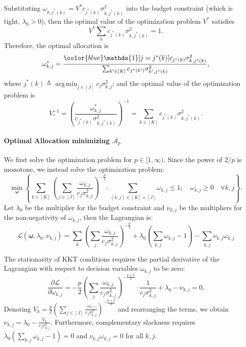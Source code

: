 \documentclass{article}
\def\gA{{\mathcal{A}}}
\def\gL{{\mathcal{L}}}
\DeclareMathOperator*{\argmin}{arg\,min}
\theoremstyle{plain}
\theoremstyle{definition}
\theoremstyle{plain}
\newcommand{\indicator}{\mathds{1}}
\begin{document}
Substituting $\omega_{k, j^*(k)} = V^* c_{j^*(k)} \sigma_{k, j^*(k)}^2$ into the budget constraint (which is tight, $\lambda_0 > 0$), then the optimal value of the optimization problem $V^*$ satisfies
\begin{equation}
    V^* \sum_{k}  c_{j^*(k)} \sigma_{k, j^*(k)}^2 = 1 .
\end{equation}
Therefore, the optimal allocation is
\begin{equation}
    \omega_{k,j}^* = \frac{{\color{blue}\indicator[j = j^*(k)]} c_{j^*(k)} \sigma_{k,j^*(k)}^2 }{\sum_{k' \in [K]} c_{j^*(k')} \sigma_{k',j^*(k)}^2 },
\end{equation}
where $j^*(k) \triangleq \argmin_{j \in [J]} c_j \sigma_{k,j}^2$; and the optimal value of the optimization problem is 
\begin{equation}
    V_*^{-1} = \left( \frac{\omega_{k,j}^*}{c_{j^*(k)} \sigma_{k,j^*(k)}^2} \right)^{-1} = \sum_{k\in[K]} c_{j^*(k)} \sigma_{k,j^*(k)}^2.
\end{equation}

\paragraph{Optimal Allocation minimizing $\gA_p$}
We first solve the optimization problem for $p\in[1,\infty)$.
Since the power of $2/p$ is monotone, we instead solve the optimization problem:
\begin{equation}
    \min_{\bm\omega} \left\{ \sum_{k \in [K]} \left( \sum_{j\in[J]} \frac{\omega_{k,j}}{c_j \sigma_{k,j}^2} \right)^{-\frac{p}{2}} : \sum_{(k,j) \in [K] \times [J]} \omega_{k,j} \leq 1; \quad \omega_{k,j} \geq 0 \quad \forall k,j \right\}.
\end{equation}
Let $\lambda_0$ be the multiplier for the budget constraint and $\nu_{k,j}$ be the multipliers for the non-negativity of $\omega_{k,j}$, then the Lagrangian is:
\begin{equation}
    \gL(\bm\omega, \lambda_0, \nu_{k,j}) =  \sum_{k} \left( \sum_{j} \frac{\omega_{k,j}}{c_j \sigma_{k,j}^2} \right)^{-\frac{p}{2}} + \lambda_0 \left( \sum_{k,j} \omega_{k,j} - 1 \right) - \sum_{k,j} \nu_{k,j} \omega_{k,j}
\end{equation}

The stationarity of KKT conditions requires the partial derivative of the Lagrangian with respect to decision variables $\omega_{k,j}$ to be zero:
\begin{equation}
    \frac{\partial \gL}{\partial \omega_{k,j}} =  -\frac{p}{2} \left( \sum_{j} \frac{\omega_{k,j}}{c_j \sigma_{k,j}^2} \right)^{-\frac{p+2}{2}} \cdot \frac{1}{c_j \sigma_{k,j}^2} + \lambda_0 - \nu_{k,j}=0.
\end{equation}
Denoting $V_k = \frac{p}{2} \left( \sum_{j\in[J]} \frac{\omega_{k,j}}{c_j \sigma_{k,j}^2} \right)^{-\frac{p+2}{2}}$ and rearranging the terms, we obtain $\nu_{k,j} = \lambda_0 - \frac{V_k}{c_j \sigma_{k,j}^2}$.
Furthermore, complementary slackness requires
$\lambda_0 (\sum_{k,j} \omega_{k,j} - 1) = 0$ and $\nu_{k,j} \omega_{k,j} = 0$ for all $k,j$.
\end{document}
